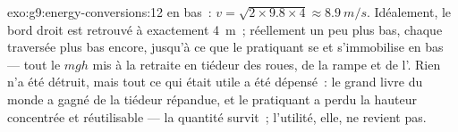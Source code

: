 \begin{solution}{exo:g9:energy-conversions:12}
 en bas~: $v = \sqrt{2 \times 9.8 \times 4} \approx
\qty{8.9}{m/s}$. Idéalement, le bord droit est retrouvé à exactement
\qty{4}{m}~; réellement un peu plus bas, chaque traversée plus bas
encore, jusqu'à ce que le pratiquant se  et s'immobilise en bas
--- tout le $m g h$ mis à la retraite en tiédeur des roues, de la
rampe et de l'. Rien n'a été détruit, mais tout ce qui était utile
a été dépensé~: le grand livre du monde a gagné de la tiédeur
répandue, et le pratiquant a perdu la hauteur concentrée et
réutilisable --- la quantité survit~; l'utilité, elle, ne revient
pas.
\end{solution}

